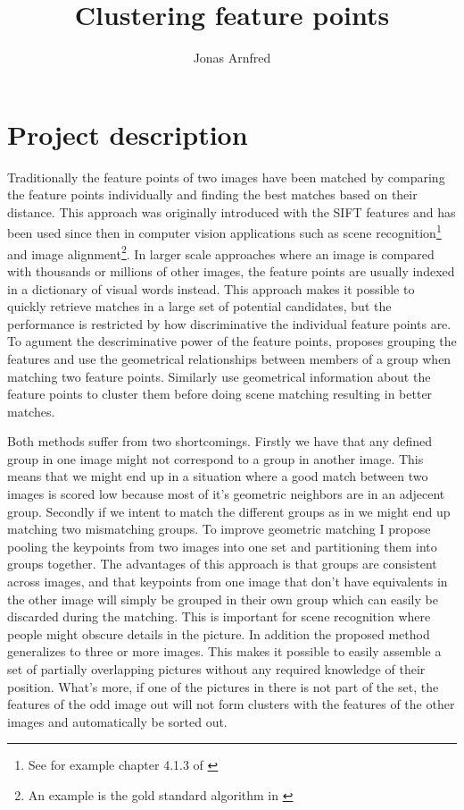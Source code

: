 \documentclass{article}
\begin{document}
\title{Clustering feature points}
\author{Jonas Arnfred}

\maketitle

\begin{abstract}
\end{abstract}

\section{Project description}

Traditionally the feature points of two images have been matched by 
comparing the feature points individually and finding the best matches 
based on their distance. This approach was originally introduced with 
the SIFT features \cite{lowe2004sift} and has been used since then in 
computer vision applications such as scene recognition\footnote{See for 
example chapter 4.1.3 of \cite[pp. 226]{szeliski2010}} and image 
alignment\footnote{An example is the gold standard algorithm in \cite[p.  
114]{multipleView}}. In larger scale approaches where an image is 
compared with thousands or millions of other images, the feature points 
are usually indexed in a dictionary of visual words instead. This 
approach makes it possible to quickly retrieve matches in a large set of 
potential candidates, but the performance is restricted by how 
discriminative the individual feature points are. To agument the 
descriminative power of the feature points, \cite{wu2009bundling} 
proposes grouping the features and use the geometrical relationships 
between members of a group when matching two feature points. Similarly 
\cite{das2008event} use geometrical information about the feature points 
to cluster them before doing scene matching resulting in better matches.

Both methods suffer from two shortcomings. Firstly we have that any 
defined group in one image might not correspond to a group in another 
image.  This means that we might end up in a situation where a good 
match between two images is scored low because most of it's geometric 
neighbors are in an adjecent group. Secondly if we intent to match the 
different groups as in \cite{wu2009bundling} we might end up matching 
two mismatching groups. To improve geometric matching I propose pooling 
the keypoints from two images into one set and partitioning them into 
groups together.  The advantages of this approach is that groups are 
consistent across images, and that keypoints from one image that don't 
have equivalents in the other image will simply be grouped in their own 
group which can easily be discarded during the matching. This is 
important for scene recognition where people might obscure details in 
the picture. In addition the proposed method generalizes to three or 
more images.  This makes it possible to easily assemble a set of 
partially overlapping pictures without any required knowledge of their 
position.  What's more, if one of the pictures in there is not part of 
the set, the features of the odd image out will not form clusters with 
the features of the other images and automatically be sorted out. 
\end{document}
